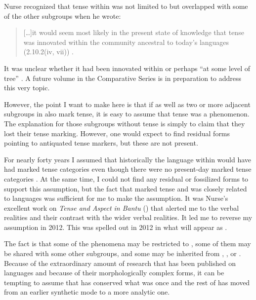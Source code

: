\documentclass[output=paper]{langsci/langscibook}
\begin{document}
Nurse recognized that tense within  was not limited to  but overlapped with some of the other  subgroups when he wrote: 
\newpage 

\begin{quote}
[…]it would seem most likely in the present state of knowledge that tense was innovated within the community ancestral to today’s  languages (2.10.2(iv, vii)) \citep[282-283]{Nurse2008}. 
\end{quote}

It was unclear whether it had been innovated within  or perhaps “at some level of  tree” \citep[282]{Nurse2008}. A future volume in the  Comparative Series is in preparation to address this very topic.

However, the point I want to make here is that if  as well as two or more adjacent subgroups in  also mark tense, it is easy to assume that tense was a  phenomenon. The explanation for those subgroups without tense is simply to claim that they lost their tense marking. However, one would expect to find residual forms pointing to antiquated tense markers, but these are not present. 

For nearly forty years I assumed that historically the  language within  would have had marked tense categories even though there were no pres\-ent-day marked tense categories \citep[364-365]{Watters1981}. At the same time, I could not find any residual or fossilized forms to support this assumption, but the fact that  marked tense and was closely related to  languages was sufficient for me to make the assumption. It was Nurse’s excellent work on \textit{Tense and Aspect in Bantu} (\citeyear{Nurse2008}) that alerted me to the  verbal realities and their contrast with the wider  verbal realities. It led me to reverse my assumption in 2012. This was spelled out in 2012 in what will appear as \citet{Watters2018}.  

The fact is that some of the  phenomena may be restricted to , some of them may be shared with some other  subgroups, and some may be inherited from , , or . Because of the extraordinary amount of research that has been published on  languages and because of their morphologically complex forms, it can be tempting to assume that  has conserved what was once  and the rest of  has moved from an earlier synthetic mode to a more analytic one. 
\end{document}
